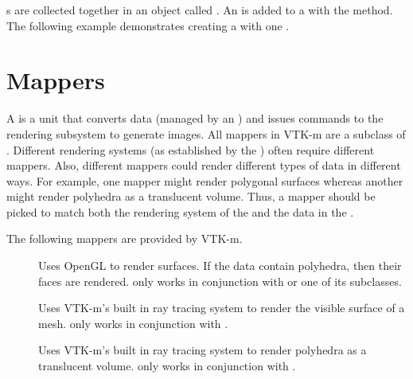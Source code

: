 s are collected together in an object called
. An  is added to a
 with the  method. The following
example demonstrates creating a  with one
.




\section{Mappers}


A  is a unit that converts data (managed by an
) and issues commands to the rendering subsystem to
generate images. All mappers in VTK-m are a subclass of
. Different rendering systems (as established by the
) often require different mappers. Also, different
mappers could render different types of data in different ways. For
example, one mapper might render polygonal surfaces whereas another might
render polyhedra as a translucent volume. Thus, a mapper should be picked
to match both the rendering system of the  and the
data in the .

The following mappers are provided by VTK-m.

\begin{description}
\item[] Uses OpenGL to render surfaces. If the data
  contain polyhedra, then their faces are rendered.
   only works in conjunction with
   or one of its subclasses.
\item[] Uses VTK-m's built in ray tracing
  system to render the visible surface of a mesh.
   only works in conjunction with
  .
\item[] Uses VTK-m's built in ray tracing
  system to render polyhedra as a translucent volume.
   only works in conjunction with
  .
\end{description}

